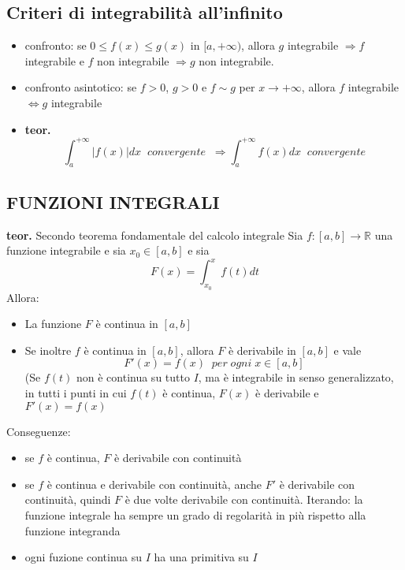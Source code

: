 \documentclass[a4paper, 9pt]{report}
\begin{document}
\subsection*{Criteri di integrabilità all'infinito}
\begin{itemize}
    \item confronto: se $0\leq f(x) \leq g(x)$ in $[a,+\infty)$, allora $g$ integrabile $\Rightarrow f$ integrabile e $f$ non integrabile $\Rightarrow g$ non integrabile.
    \item confronto asintotico: se $f>0$, $g>0$ e $f \sim g$ per $x \rightarrow + \infty$, allora $f$ integrabile $\Leftrightarrow g$ integrabile
    \item \textbf{teor.} 
    \[
        \int_{a}^{+\infty}|f(x)| dx \;\; convergente \;\; \Rightarrow \int_{a}^{+\infty} f(x) dx \;\;convergente
    \]
\end{itemize}
\subsection*{FUNZIONI INTEGRALI}
\textbf{teor.} Secondo teorema fondamentale del calcolo integrale \newline
Sia $f: [a,b] \rightarrow \mathbb{R}$ una funzione integrabile e sia $x_0 \in [a,b]$ e sia 
\[
    F(x) = \int_{x_0}^{x} f(t) dt
\]
Allora:
\begin{itemize}
    \item La funzione $F$ è continua in $[a,b]$
    \item Se inoltre $f$ è continua in $[a,b]$, allora $F$ è derivabile in $[a,b]$ e vale
    \[
        F'(x) = f(x) \;\; per \; ogni \; x \in[a,b]
    \]
    (Se $f(t)$ non è continua su tutto $I$, ma è integrabile in senso generalizzato, in tutti i punti in cui $f(t)$ è continua, $F(x)$ è derivabile e $F'(x) = f(x)$
\end{itemize}
Conseguenze:
\begin{itemize}
    \item se $f$ è continua, $F$ è derivabile con continuità
    \item se $f$ è continua e derivabile con continuità, anche $F'$ è derivabile con continuità, quindi $F$ è due volte derivabile con continuità. Iterando: la funzione integrale ha sempre un grado di regolarità in più rispetto alla funzione integranda
    \item ogni fuzione continua su $I$ ha una primitiva su $I$
\end{itemize}
\end{document}
